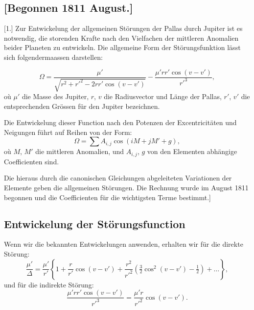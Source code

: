 \documentclass[12pt,a4paper]{article}
\begin{document}
\subsection*{[Begonnen 1811 August.]}

[1.] Zur Entwickelung der allgemeinen St\"{o}rungen der Pallas durch Jupiter ist es notwendig, die storenden Krafte nach den Vielfachen der mittleren Anomalien beider Planeten zu entwickeln. Die allgemeine Form der St\"{o}rungsfunktion l\"{a}sst sich folgendermaassen darstellen:

\begin{equation}
\Omega = \frac{\mu'}{\sqrt{r^2 + r'^2 - 2rr'\cos(v - v')}} - \frac{\mu'rr'\cos(v - v')}{r'^3},
\end{equation}
o\`{u} $\mu'$ die Masse des Jupiter, $r$, $v$ die Radiusvector und L\"{a}nge der Pallas, $r'$, $v'$ die entsprechenden Gr\"{o}ssen f\"{u}r den Jupiter bezeichnen.

Die Entwickelung dieser Function nach den Potenzen der Excentricit\"{a}ten und Neigungen f\"{u}hrt auf Reihen von der Form:
\begin{equation}
\Omega = \sum A_{i,j} \cos(iM + jM' + g),
\end{equation}
o\`{u} $M$, $M'$ die mittleren Anomalien, und $A_{i,j}$, $g$ von den Elementen abh\"{a}ngige Coefficienten sind.

Die hieraus durch die canonischen Gleichungen abgeleiteten Variationen der Elemente geben die allgemeinen St\"{o}rungen. Die Rechnung wurde im August 1811 begonnen und die Coefficienten f\"{u}r die wichtigsten Terme bestimmt.]

\newpage
\subsection*{Entwickelung der St\"{o}rungsfunction}

Wenn wir die bekannten Entwickelungen anwenden, erhalten wir f\"{u}r die direkte St\"{o}rung:
\begin{equation}
\frac{\mu'}{\Delta} = \frac{\mu'}{r'}\left\{1 + \frac{r}{r'}\cos(v - v') + \frac{r^2}{r'^2}\left(\tfrac{3}{2}\cos^2(v - v') - \tfrac{1}{2}\right) + \ldots\right\},
\end{equation}
und f\"{u}r die indirekte St\"{o}rung:
\begin{equation}
\frac{\mu'rr'\cos(v - v')}{r'^3} = \frac{\mu' r}{r'^2}\cos(v - v').
\end{equation}
\end{document}

